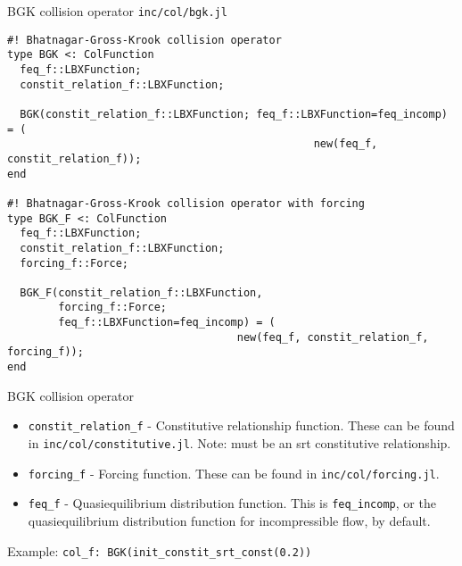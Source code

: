 \documentclass[pdf]{beamer}
\begin{document}
\begin{frame}[fragile]{BGK collision operator}
  \texttt{inc/col/bgk.jl}
  \tiny
  \begin{lstlisting}
#! Bhatnagar-Gross-Krook collision operator 
type BGK <: ColFunction
  feq_f::LBXFunction;
  constit_relation_f::LBXFunction;

  BGK(constit_relation_f::LBXFunction; feq_f::LBXFunction=feq_incomp) = (
                                                new(feq_f, constit_relation_f));
end

#! Bhatnagar-Gross-Krook collision operator with forcing 
type BGK_F <: ColFunction
  feq_f::LBXFunction;
  constit_relation_f::LBXFunction;
  forcing_f::Force;

  BGK_F(constit_relation_f::LBXFunction,
        forcing_f::Force; 
        feq_f::LBXFunction=feq_incomp) = (
                                    new(feq_f, constit_relation_f, forcing_f));
end
  \end{lstlisting}
\end{frame}

\begin{frame}{BGK collision operator}
  \begin{itemize}
    \item \texttt{constit\_relation\_f} - Constitutive relationship function. These can be found in \texttt{inc/col/constitutive.jl}. Note: must be an srt constitutive relationship.
    \item \texttt{forcing\_f} - Forcing function. These can be found in \texttt{inc/col/forcing.jl}.
    \item \texttt{feq\_f} - Quasiequilibrium distribution function. This is \texttt{feq\_incomp}, or the quasiequilibrium distribution function for incompressible flow, by default.
  \end{itemize}
  Example: \texttt{col\_f:      BGK(init\_constit\_srt\_const(0.2))}
\end{frame}
\end{document}
